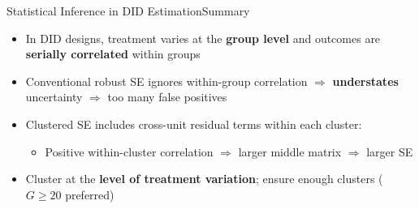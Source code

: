 \documentclass[dvipsnames,hyperref={pdfpagelabels=false}]{beamer}
\begin{document}
\begin{frame}{Statistical Inference in DID Estimation}{Summary}
    \begin{itemize}
        \item In DID designs, treatment varies at the \textbf{group level} and outcomes are \textbf{serially correlated} within groups
        \vspace{0.2cm}
        \item Conventional robust SE ignores within-group correlation $\Rightarrow$ \textbf{understates} uncertainty $\Rightarrow$ too many false positives
        \vspace{0.2cm}
        \item Clustered SE includes cross-unit residual terms within each cluster:
        \vspace{0.2cm}
        \begin{itemize}
            \item Positive within-cluster correlation $\Rightarrow$ larger middle matrix $\Rightarrow$ larger SE
        \end{itemize}
        \vspace{0.2cm}
        \item Cluster at the \textbf{level of treatment variation}; ensure enough clusters ($G \geq 20$ preferred)
    \end{itemize}
\end{frame}

%
%
\end{document}
